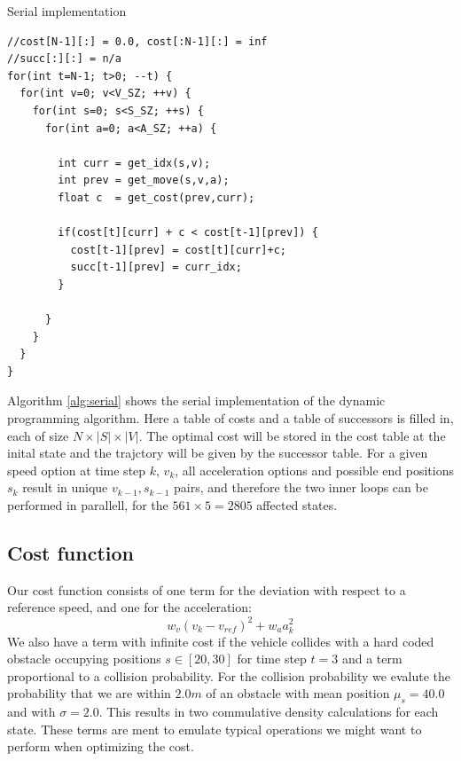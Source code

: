 \documentclass[a4paper,10pt,twocolumn]{article}
\begin{document}
\begin{algorithm}
\center
\caption{Serial implementation}
\label{alg:serial}
\begin{footnotesize}
\begin{verbatim}
//cost[N-1][:] = 0.0, cost[:N-1][:] = inf
//succ[:][:] = n/a
for(int t=N-1; t>0; --t) {
  for(int v=0; v<V_SZ; ++v) {
    for(int s=0; s<S_SZ; ++s) {
      for(int a=0; a<A_SZ; ++a) {
      
        int curr = get_idx(s,v);
        int prev = get_move(s,v,a);
        float c  = get_cost(prev,curr);

        if(cost[t][curr] + c < cost[t-1][prev]) {
          cost[t-1][prev] = cost[t][curr]+c;
          succ[t-1][prev] = curr_idx;
        }

      }
    }
  }
}
\end{verbatim}
\end{footnotesize}
\end{algorithm}

Algorithm \ref{alg:serial} shows the serial implementation of 
the dynamic programming algorithm. Here a table of costs and a table 
of successors is filled in, each of size $N\times|S|\times|V|$.
The optimal cost will be stored in the cost table at the inital 
state and the trajctory will be given by the successor table.
For a given speed option at time step $k$, $v_k$, all acceleration options
and possible end positions $s_k$ result in unique $v_{k-1},s_{k-1}$ pairs, and 
therefore the two inner loops can be performed in parallell, for the
$561 \times 5 = 2805$ affected states.

\subsection{Cost function}

Our cost function consists of one term for the deviation with 
respect to a reference speed, and one for the acceleration:
$$
w_v(v_k-v_{ref})^2+w_a a_k^2
$$
We also have a term with infinite cost if the vehicle collides with a
hard coded obstacle occupying positions $s \in [20,30]$ for time step
$t=3$ and a term proportional to a collision probability. For the
collision probability we evalute the probability that we are within
$2.0 m$ of an obstacle with mean position $\mu_s = 40.0$ and with
$\sigma = 2.0$.  This results in two commulative density calculations
for each state.
These terms are ment to emulate typical operations we might want 
to perform when optimizing the cost. 
\end{document}
